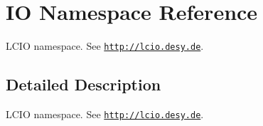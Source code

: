 \hypertarget{namespace_i_o}{}\section{IO Namespace Reference}
\label{namespace_i_o}


L\+C\+IO namespace. See \href{http://lcio.desy.de}{\tt http\+://lcio.\+desy.\+de}.  




\subsection{Detailed Description}
L\+C\+IO namespace. See \href{http://lcio.desy.de}{\tt http\+://lcio.\+desy.\+de}. 